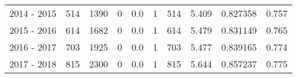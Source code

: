 \begin{tabular}{lrrrrrrrlr}
2014 - 2015 &      514 &     1390 &                 0 &               0.0 &                       1 &                        514 &       5.409 &   0.827358 &             0.757 \\
2015 - 2016 &      614 &     1682 &                 0 &               0.0 &                       1 &                        614 &       5.479 &   0.831149 &             0.765 \\
2016 - 2017 &      703 &     1925 &                 0 &               0.0 &                       1 &                        703 &       5.477 &   0.839165 &             0.774 \\
2017 - 2018 &      815 &     2300 &                 0 &               0.0 &                       1 &                        815 &       5.644 &   0.857237 &             0.775 \\
\bottomrule
\end{tabular}
